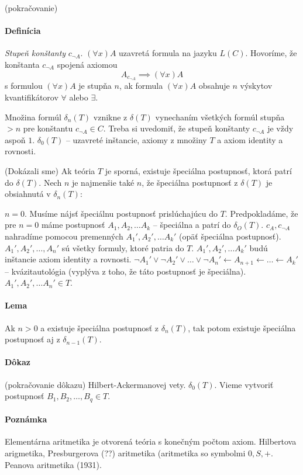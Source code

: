 (pokračovanie)
\paragraph{Definícia} \emph{Stupeň konštanty} $c_{\neg A}$. $(\forall x) A$
uzavretá formula na jazyku $L(C)$. Hovoríme, že konštanta $c_{\neg A}$ spojená
axiomou $$A_{c_{\neg A}} \implies (\forall x) A$$ s formulou $(\forall x) A$ je
stupňa $n$, ak formula $(\forall x) A$ obsahuje $n$ výskytov kvantifikátorov
$\forall$ alebo $\exists$. 

\par Množina formúl $\delta_n(T)$ vznikne z $\delta(T)$ vynechaním všetkých
formúl stupňa $>n$ pre konštantu $c_{\neg A} \in C$. Treba si uvedomiť, že
stupeň konštanty $c_{\neg A}$ je vždy aspoň $1$. $\delta_0(T)$ -- uzavreté
inštancie, axiomy z množiny $T$ a axiom identity a rovnosti.

\par (Dokázali sme) Ak teória $T$ je sporná, existuje špeciálna postupnosť,
ktorá patrí do $\delta(T)$. Nech $n$ je najmenšie také $n$, že špeciálna
postupnosť z $\delta(T)$ je obsiahnutá v $\delta_n(T)$:

$n=0$. Musíme nájsť špeciálnu postupnosť prislúchajúcu do $T$.
Predpokladáme, že pre $n=0$ máme postupnosť $A_1, A_2, \ldots A_k$ --
špeciálna a patrí do $\delta_O(T)$. $c_A, c_{\neg A}$ nahradíme pomocou
premenných $A_1', A_2', \ldots A_k'$ (opäť špeciálna postupnosť). $A_1',
A_2', \ldots, A_n'$ sú všetky formuly, ktoré patria do $T$. $A_1', A_2',
\ldots A_k'$ budú inštancie axiom identity a rovnosti. $\neg A_1' \lor
\neg A_2' \lor \ldots \lor \neg A_n' \leftarrow A_{n+1} \leftarrow
\ldots \leftarrow A_k'$ -- kvázitautológia (vyplýva z toho, že táto
postupnosť je špeciálna). $A_1', A_2', \ldots A_n' \in T$.

\paragraph{Lema} Ak $n>0$ a existuje špeciálna postupnosť z $\delta_n(T)$, tak
potom existuje špeciálna postupnosť aj z $\delta_{n-1}(T)$.

\paragraph{Dôkaz} (pokračovanie dôkazu) Hilbert-Ackermanovej vety.
$\delta_0(T)$. Vieme vytvoriť postupnosť $B_1, B_2, \ldots, B_q \in T$.

\paragraph{Poznámka} Elementárna aritmetika je otvorená teória s konečným počtom
axiom. Hilbertova arigmetika, Presburgerova (??) aritmetika (aritmetika so
symbolmi $0, S, +$. Peanova aritmetika (1931).

